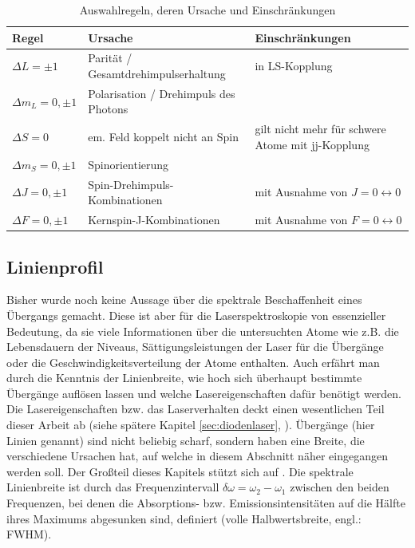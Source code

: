 \begin{table}
	\begin{tabular}{p{}p{}p{}}
		\toprule
		Regel & Ursache & Einschränkungen \\
		\midrule[1px]
		\hline
		$\Delta L = \pm1$ & Parität / Gesamtdrehimpulserhaltung & in LS-Kopplung \\
		$\Delta m_L = 0, \pm1$ & Polarisation / Drehimpuls des Photons & \\
		$\Delta S = 0$ & em. Feld koppelt nicht an Spin & gilt nicht mehr für schwere
		Atome mit jj-Kopplung \\
		$\Delta m_S = 0, \pm1$ & Spinorientierung & \\
		$\Delta J = 0, \pm1$ & Spin-Drehimpuls-Kombinationen & mit Ausnahme von
		$J=0\leftrightarrow0$
		\\
		$\Delta F = 0, \pm1$ & Kernspin-J-Kombinationen & mit Ausnahme von
		$F=0\leftrightarrow0$
		\\
		\bottomrule[1px]
	\end{tabular}
	\caption[Auswahlregeln]{Auswahlregeln, deren Ursache und Einschränkungen}
	\label{tab:auswahlregeln}
\end{table}



\subsection{Linienprofil}\label{sec:linienprofil}
Bisher wurde noch keine Aussage über die spektrale Beschaffenheit eines
Übergangs gemacht. Diese ist aber für die Laserspektroskopie von essenzieller
Bedeutung, da sie viele Informationen über die untersuchten Atome wie z.B. die
Lebensdauern der Niveaus, Sättigungsleistungen der Laser für die Übergänge oder
die Geschwindigkeitsverteilung der Atome enthalten. Auch erfährt man durch die
Kenntnis der Linienbreite, wie hoch sich überhaupt bestimmte Übergänge auflösen
lassen und welche Lasereigenschaften dafür benötigt werden. Die
Lasereigenschaften bzw. das Laserverhalten deckt einen wesentlichen Teil
dieser Arbeit ab (siehe spätere Kapitel \ref{sec:diodenlaser},
).
Übergänge (hier Linien genannt) sind nicht beliebig scharf, sondern haben eine Breite, die verschiedene Ursachen hat, auf welche in diesem Abschnitt näher eingegangen werden soll. Der Großteil dieses Kapitels stützt sich auf \cite{demtroeder:laserspektroskopie}. Die spektrale Linienbreite ist durch das Frequenzintervall $\delta\omega=\omega_2-\omega_1$ zwischen den beiden
Frequenzen, bei denen die Absorptions- bzw. Emissionsintensitäten auf die Hälfte
ihres Maximums abgesunken sind, definiert (volle Halbwertsbreite, engl.:
FWHM).

